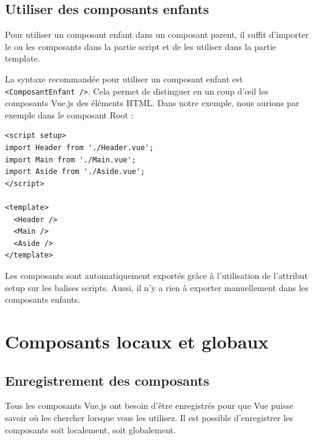 \documentclass{article}
\begin{document}
\subsection{Utiliser des composants enfants}
Pour utiliser un composant enfant dans un composant parent, il suffit d'importer le ou les composants dans la partie {\color{monOrange}script} et de les utiliser dans la partie {\color{monOrange}template}.

La syntaxe recommandée pour utiliser un composant enfant est {\tt <ComposantEnfant />}. Cela permet de distinguer en un coup d'œil les composants {\color{monOrange}Vue.js} des éléments HTML. Dans notre exemple, nous aurions par exemple dans le composant {\color{monOrange}Root }:
\begin{verbatim}
<script setup>
import Header from './Header.vue';
import Main from './Main.vue';
import Aside from './Aside.vue';
</script>

<template>
  <Header />
  <Main />
  <Aside />
</template>
\end{verbatim}
Les composants sont automatiquement exportés grâce à l'utilisation de l'attribut {\color{monOrange}setup} sur les balises {\color{monOrange}scripts}. Aussi, il n'y a rien à exporter manuellement dans les composants enfants.


\section{Composants locaux et globaux}
\subsection{Enregistrement des composants}
Tous les composants {\color{monOrange}Vue.js} ont besoin d'être enregistrés pour que {\color{monOrange}Vue} puisse savoir où les chercher lorsque vous les utilisez. Il est possible d'enregistrer les composants soit localement, soit globalement.
\end{document}
